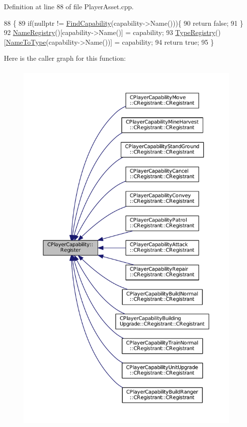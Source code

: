 Definition at line 88 of file Player\+Asset.\+cpp.


\begin{DoxyCode}
88                                                                              \{
89     \textcolor{keywordflow}{if}(\textcolor{keyword}{nullptr} != \hyperlink{classCPlayerCapability_a881ba4b87385d7cfe5cb6ced2d26f226}{FindCapability}(capability->Name()))\{
90         \textcolor{keywordflow}{return} \textcolor{keyword}{false};    
91     \}
92     \hyperlink{classCPlayerCapability_aa804d42c236f11ec9549057c22699837}{NameRegistry}()[capability->Name()] = capability;
93     \hyperlink{classCPlayerCapability_ab7fee932703792663278b1b2128f00f3}{TypeRegistry}()[\hyperlink{classCPlayerCapability_a920a696526e8a839f728192aea0ba1c5}{NameToType}(capability->Name())] = capability;
94     \textcolor{keywordflow}{return} \textcolor{keyword}{true};
95 \}
\end{DoxyCode}
Here is the caller graph for this function\+:\nopagebreak
\begin{figure}[H]
\begin{center}
\leavevmode
\includegraphics[height=550pt]{classCPlayerCapability_a7e298018dcde2684451add3cfff065f7_icgraph}
\end{center}
\end{figure}
\hypertarget{classCPlayerCapability_a022d6efcdc0897253d7c2e33ade0851d}{}\label{classCPlayerCapability_a022d6efcdc0897253d7c2e33ade0851d} 
